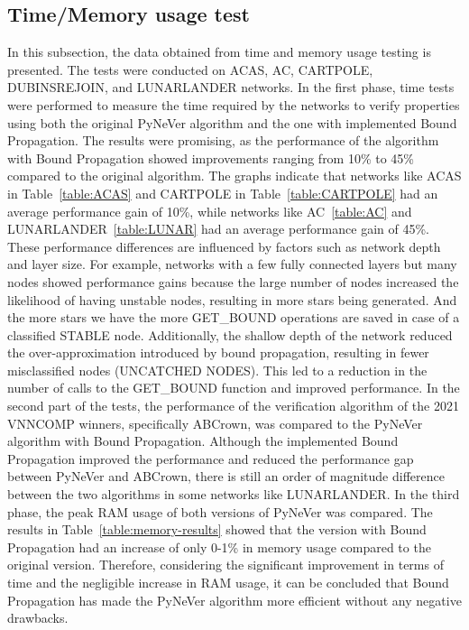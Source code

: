 \subsection{Time/Memory usage test}
In this subsection, the data obtained from time and memory usage testing is presented. The tests were conducted on ACAS, AC, CARTPOLE, DUBINSREJOIN, and LUNARLANDER networks. In the first phase, time tests were performed to measure the time required by the networks to verify properties using both the original PyNeVer algorithm and the one with implemented Bound Propagation. The results were promising, as the performance of the algorithm with Bound Propagation showed improvements ranging from 10\% to 45\% compared to the original algorithm. 
The graphs indicate that networks like ACAS in Table~\ref{table:ACAS} and CARTPOLE in Table~\ref{table:CARTPOLE} had an average performance gain of 10\%, while networks like AC~\ref{table:AC} and LUNARLANDER~\ref{table:LUNAR} had an average performance gain of 45\%. These performance differences are influenced by factors such as network depth and layer size.
For example, networks with a few fully connected layers but many nodes showed performance gains because the large number of nodes increased the likelihood of having unstable nodes, resulting in more stars being generated. And the more stars we have the more GET\_BOUND operations are saved in case of a classified STABLE node. Additionally, the shallow depth of the network reduced the over-approximation introduced by bound propagation, resulting in fewer misclassified nodes (UNCATCHED NODES). This led to a reduction in the number of calls to the GET\_BOUND function and improved performance.
In the second part of the tests, the performance of the verification algorithm of the 2021 VNNCOMP winners, specifically ABCrown, was compared to the PyNeVer algorithm with Bound Propagation. Although the implemented Bound Propagation improved the performance and reduced the performance gap between PyNeVer and ABCrown, there is still an order of magnitude difference between the two algorithms in some networks like LUNARLANDER.
In the third phase, the peak RAM usage of both versions of PyNeVer was compared. The results in Table~\ref{table:memory-results} showed that the version with Bound Propagation had an increase of only 0-1\% in memory usage compared to the original version. Therefore, considering the significant improvement in terms of time and the negligible increase in RAM usage, it can be concluded that Bound Propagation has made the PyNeVer algorithm more efficient without any negative drawbacks.

